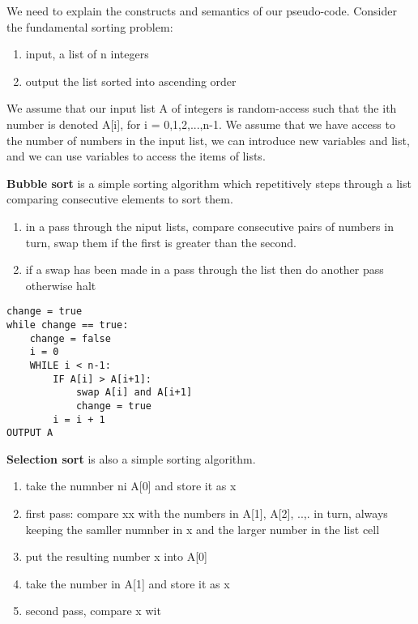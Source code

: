 We need to explain the constructs and semantics of our pseudo-code.
Consider the fundamental sorting problem:
\begin{enumerate}
    \item input, a list of n integers
    \item output the list sorted into ascending order
\end{enumerate}

We assume that our input list A of integers is random-access such that the ith number is denoted A[i], for i = 0,1,2,...,n-1. We assume that we have access to the number of numbers in the input list, we can introduce new variables and list, and we can use variables to access the items of lists.


\begin{definition}
    \textbf{Bubble sort} is a simple sorting algorithm which repetitively steps through a list comparing consecutive elements to sort them.
    \begin{enumerate}
        \item in a pass through the niput lists, compare consecutive pairs of numbers in turn, swap them if the first is greater than the second.
        \item if a swap has been made in a pass through the list then do another pass otherwise halt
    \end{enumerate}
\end{definition}

\begin{lstlisting}[caption=Bubble sort]
change = true
while change == true:
    change = false
    i = 0
    WHILE i < n-1:
        IF A[i] > A[i+1]:
            swap A[i] and A[i+1]
            change = true
        i = i + 1
OUTPUT A
\end{lstlisting}


\begin{definition}
    \textbf{Selection sort} is also a simple sorting algorithm.
    
    \begin{enumerate}
        \item take the numnber ni A[0] and store it as x
        \item first pass: compare xx with the numbers in A[1], A[2], ..,. in turn, always keeping the samller numnber in x and the larger number in the list cell
        \item put the resulting number x into A[0]
        \item take the number in A[1] and store it as x
        \item second pass, compare x wit
    \end{enumerate}
\end{definition}


